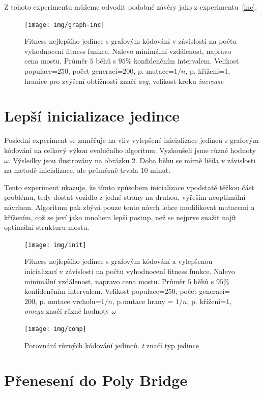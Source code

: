Z tohoto experimentu můžeme odvodit podobné závéry jako z experimentu~\ref{inc}. 

\begin{figure}[p]\centering
\texttt{[image: img/graph-inc]}
\caption{Fitness nejlepšího jedince s grafovým kódování v závislosti na počtu vyhodnocení fitness funkce. Nalevo minimální vzdálenost, napravo cena mostu. Průměr $5$ běhů s $95\%$ konfidenčním intervalem. Velikost populace=$250$, počet generací=$200$, p. mutace=$1/n$, p. křížení=$1$, hranice pro zvýšení obtížnosti značí \emph{avg}, velikost kroku \emph{increase}}
\label{exp:8}
\end{figure}


\section{Lepší inicializace jedince}

Poslední experiment se zaměřuje na vliv vylepšené inicializace jedinců s grafovým kódování na celkový výkon evolučního algoritmu. Vyzkoušeli jsme různé hodnoty $\omega$. Výsledky jsou ilustrovány na obrázku \ref{exp:9}. Doba běhu se mírně lišila v závislosti na metodě inicializace, ale průměrně trvala 10 minut.

Tento experiment ukazuje, že tímto způsobem inicializace vpodstatě těžkou část problému, tedy dostat vozidlo z jedné strany na druhou, vyřeším neoptimální návrhem. Algoritmu pak zbývá pouze tento návrh lehce modifikovat mutacemi a křížením, což se jeví jako mnohem lepší postup, než se nejprve snažit najít optimální strukturu mostu. 

\begin{figure}[p]\centering
\texttt{[image: img/init]}
\caption{Fitness nejlepšího jedince s grafovým kódování a vylepšenou inicializací v závislosti na počtu vyhodnocení fitness funkce. Nalevo minimální vzdálenost, napravo cena mostu. Průměr $5$ běhů s $95\%$ konfidenčním intervalem. Velikost populace=$250$, počet generací=$200$, p. mutace vrcholu=$1/n$, p.mutace hrany = $1/n$, p. křížení=$1$, \emph{omega} značí různé hodnoty $\omega$}
\label{exp:9}
\end{figure}


\begin{figure}[p]\centering
\texttt{[image: img/comp]}
\caption{Porovnání různých kódování jedinců. \emph{t} značí typ jedince}
\label{zaver:1}
\end{figure}


\section{Přenesení do Poly Bridge}

